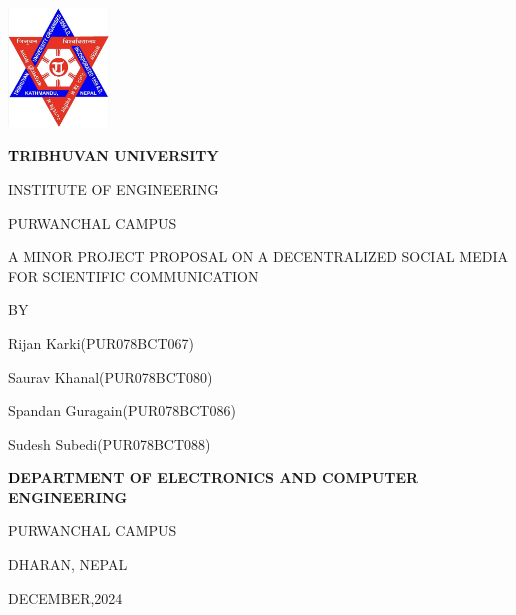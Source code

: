 \begin{titlepage}
    \centering
    
    \includegraphics[width=0.2\textwidth]{Graphics/TULogo.png}\par
    \vspace{1.2cm}
    {\fontsize{14pt}{12pt}\selectfont\bfseries\textcolor{black}
    TRIBHUVAN UNIVERSITY \par INSTITUTE OF ENGINEERING \par PURWANCHAL CAMPUS \par
    \vspace{1.2cm}
    \begin{flushleft}
    
    \end{flushleft}

    \par A MINOR PROJECT PROPOSAL ON A DECENTRALIZED SOCIAL MEDIA FOR SCIENTIFIC COMMUNICATION\par

    \vspace{1.2cm}
    BY\par Rijan Karki(PUR078BCT067)
      \par Saurav Khanal(PUR078BCT080)
      \par Spandan Guragain(PUR078BCT086)
      \par Sudesh Subedi(PUR078BCT088)
    \vspace{1.2cm}\par
    }
    {\fontsize{13pt}{12pt}\selectfont\bfseries\textcolor{black}
    DEPARTMENT OF ELECTRONICS AND COMPUTER ENGINEERING\par PURWANCHAL CAMPUS\par DHARAN, NEPAL\par
    \vspace{1.2cm}
    \vspace{1.2cm}
    
    DECEMBER,2024 
    }
\end{titlepage}
